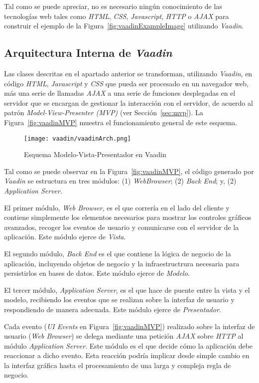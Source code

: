 Tal como se puede apreciar, no es necesario ningún conocimiento de las tecnologías web tales como \emph{HTML}, \emph{CSS}, \emph{Javascript}, \emph{HTTP} o \emph{AJAX} para construir el ejemplo de la Figura~\ref{fig:vaadinExampleImage} utilizando \emph{Vaadin}.

\subsection{Arquitectura Interna de \emph{Vaadin}}

Las clases descritas en el apartado anterior se transforman, utilizando \emph{Vaadin}, en código \emph{HTML}, \emph{Javascript} y \emph{CSS} que pueda ser procesado en un navegador web, más una serie de llamadas \emph{AJAX} a una serie de funciones desplegadas en el servidor que se encargan de gestionar la interacción con el servidor, de acuerdo al patrón \emph{Model-View-Presenter (MVP)} (ver Sección~\ref{sec:mvp}). La Figura~\ref{fig:vaadinMVP} muestra el funcionamiento general de este esquema.

\begin{figure}
	\centering
	\texttt{[image: vaadin/vaadinArch.png]}
	\caption{Esquema Modelo-Vista-Presentador en Vaadin}
	\label{fig:fig:vaadinMVP}
\end{figure}

Tal como se puede observar en la Figura~\ref{fig:vaadinMVP}, el código generado por \emph{Vaadin} se estructura en tres módulos: (1) \emph{WebBrowser}; (2) \emph{Back End}; y, (2) \emph{Application Server}.

El primer módulo, \emph{Web Browser}, es el que correría en el lado del cliente y contiene simplemente los elementos necesarios para mostrar los controles gráficos avanzados, recoger los eventos de usuario y comunicarse con el servidor de la aplicación. Este módulo ejerce de \emph{Vista}.

El segundo módulo, \emph{Back End} es el que contiene la lógica de negocio de la aplicación, incluyendo objetos de negocio y la infraestructrura necesaria para persistirlos en bases de datos. Este módulo ejerce de \emph{Modelo}.

El tercer módulo, \emph{Application Server}, es el que hace de puente entre la vista y el modelo, recibiendo los eventos que se realizan sobre la interfaz de usuario y respondiendo de manera adecuada. Este módulo ejerce de \emph{Presentador}.

Cada evento (\emph{UI Events} en Figura~\ref{fig:vaadinMVP}) realizado sobre la interfaz de usuario (\emph{Web Browser}) se delega mediante una petición \emph{AJAX} sobre \emph{HTTP} al módulo \emph{Application Server}. Este módulo es el que decide cómo la aplicación debe reaccionar a dicho evento. Esta reacción podría implicar desde simple cambio en la interfaz gráfica hasta el procesamiento de una larga y compleja regla de negocio. 


